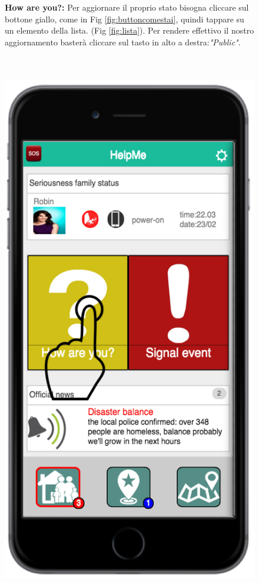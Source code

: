  
\begin{figure}
\textbf{How are you?:} Per aggiornare il proprio stato bisogna cliccare sul bottone giallo, come in Fig \ref{fig:buttoncomestai}, quindi tappare su un elemento della lista. (Fig \ref{fig:lista}). Per rendere effettivo il nostro aggiornamento basterà cliccare sul tasto in alto a destra:\textit{"Public"}.
\\ \\ \\
 \begin{minipage}[b]{6cm}
   \centering
  \includegraphics[scale=0.9]{interfaccia/tapbuttoncomestai.png}

\end{minipage}
\end{figure}
